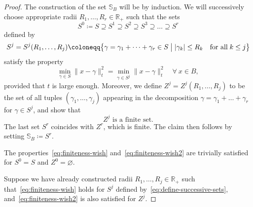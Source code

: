 \documentclass[AHL,Unicode,longabstracts]{cedram}
\newcommand{\normsq}[1]{\|#1\|^{2}}
\newcommand{\refnorm}[1]{\lvert#1\rvert}
\newcommand{\R}{\mathbb{R}}
\renewcommand{\S}{\mathbb{S}}
\renewcommand{\emptyset}{\varnothing}
\let\oldforall\forall
\renewcommand*{\forall}{\mathrel{\oldforall}}
\begin{document}
\begin{proof}
The construction of the set $\S_B$ will be by induction. We will successively choose appropriate radii $R_1, \dots, R_r \in \R_+$ such that the sets
\[
S^0 \coloneqq S\supseteq S^1 \supseteq S^2 \supseteq S^3 \supseteq \dots \supseteq S^{r}
\]
defined by
\begin{equation}\label{eq:define-successive-sets}
S^j = S^j(R_1, \dots, R_j) \coloneqq \bigl\{ \gamma = \gamma_1 + \dots +\gamma_r \in S \bigm|  \refnorm{\gamma_k} \le R_k \quad\text{for all}\; k \le j \bigr\}
\end{equation}
satisfy the property
\begin{equation}\label{eq:finiteness-wish}
\min_{\gamma \in S} \normsq{x -\gamma}_t = \min_{\gamma \in S^j} \normsq{x -\gamma}_t \quad \forall \: x\in B,
\end{equation}
provided that $t$ is large enough. Moreover, we define $Z^j=Z^j(R_1, \dots, R_j)$ to be the set of all tuples $(\gamma_1, \dots, \gamma_j)$ appearing in the decomposition $\gamma =\gamma_1 + \dots +\gamma_r$ for $\gamma \in S^j$, and show that
\begin{equation}\label{eq:finiteness-wish2}
Z^j \text{ is a finite set.}
\end{equation}
The last set $S^r$ coincides with $Z^r$, which is finite. The claim then follows by setting $\S_B \coloneqq S^r$.


The properties~\eqref{eq:finiteness-wish} and~\eqref{eq:finiteness-wish2} are trivially satisfied for $S^0 = S$ and $Z^0 =\emptyset$.

Suppose we have already constructed radii $R_1, \dots, R_j \in \R_+$ such that~\eqref{eq:finiteness-wish} holds for $S^j$ defined by~\eqref{eq:define-successive-sets}, and~\eqref{eq:finiteness-wish2} is also satisfied for $Z^j$.



\end{proof}
\end{document}
